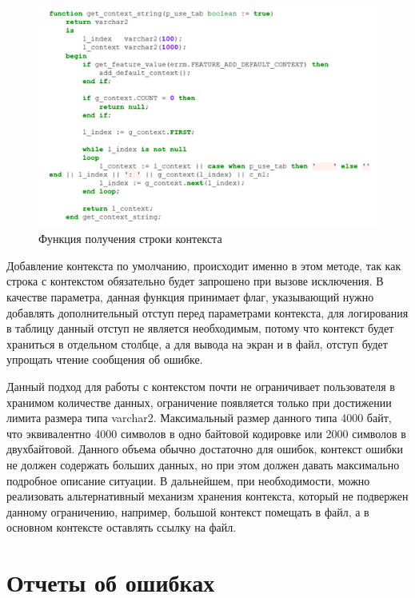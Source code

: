 \begin{figure}[ht!] 
	\center
	\includegraphics [scale=1] {my_folder/img/c3_get_context_code.png}
	\caption{Функция получения строки контекста} 
	\label{fig:c3_get_context_code}  
\end{figure}
\FloatBarrier

Добавление контекста по умолчанию, происходит именно в этом методе, так как строка с контекстом обязательно будет запрошено при вызове исключения. В качестве параметра, данная функция принимает флаг, указывающий нужно добавлять дополнительный отступ перед параметрами контекста, для логирования в таблицу данный отступ не является необходимым, потому что контекст будет храниться в отдельном столбце, а для вывода на экран и в файл, отступ будет упрощать чтение сообщения об ошибке.

Данный подход для работы с контекстом почти не ограничивает пользователя в хранимом количестве данных, ограничение появляется только при достижении лимита размера типа varchar2. Максимальный размер данного типа 4000 байт, что эквивалентно 4000 символов в одно байтовой кодировке или 2000 символов в двухбайтовой. Данного объема обычно достаточно для ошибок, контекст ошибки не должен содержать больших данных, но при этом должен давать максимально подробное описание ситуации. В дальнейшем, при необходимости, можно реализовать альтернативный механизм хранения контекста, который не подвержен данному ограничению, например, большой контекст помещать в файл, а в основном контексте оставлять ссылку на файл. 

\section{Отчеты об ошибках} \label{ch3:sec9}
 
